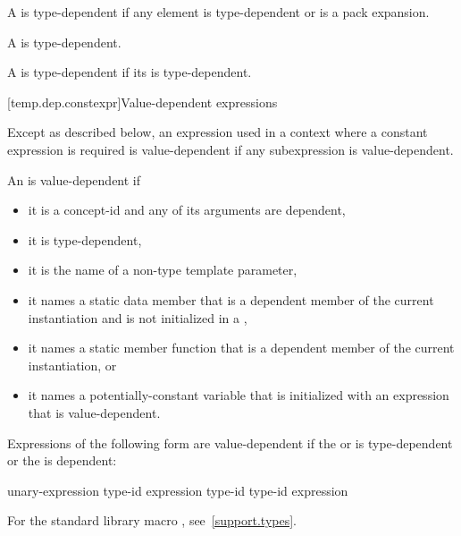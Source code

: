 \pnum
A  is type-dependent if any element is
type-dependent or is a pack expansion.

\pnum
A  is type-dependent.

\pnum
A  is type-dependent
if its  is type-dependent.

[temp.dep.constexpr]{Value-dependent expressions}

\pnum
Except as described below, an expression used in a context where a
constant expression is required is value-dependent if any
subexpression is value-dependent.

\pnum
An
is value-dependent if
\begin{itemize}
\item
it is a concept-id and any of its arguments are dependent,
\item
it is type-dependent,
\item
it is the name of a non-type template parameter,
\item
it names a static data member that is a dependent member of the current
instantiation and is not initialized in a ,
\item
it names a static member function that is a dependent member of the current
instantiation, or
\item
it names a potentially-constant variable
that is initialized with an expression that is value-dependent.
\end{itemize}

Expressions of the following form are value-dependent if the
 or 
is type-dependent or the
is dependent:

\begin{ncsimplebnf}
 unary-expression\br
{} \terminal{(} type-id \terminal{)}\br
{} \terminal{(} expression \terminal{)}\br
{} \terminal{(} type-id \terminal{)}\br
{} \terminal{(} type-id \terminal{)}\br
{} \terminal{(} expression \terminal{)}
\end{ncsimplebnf}

\begin{note}
For the standard library macro ,
see~\ref{support.types}.
\end{note}

